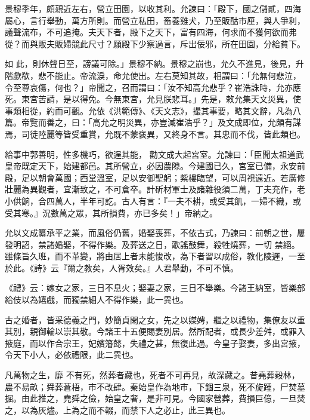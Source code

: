 \begin{pinyinscope}
 景穆季年，頗親近左右，營立田園，以收其利。允諫曰：「殿下，國之儲貳，四海屬心，言行舉動，萬方所則。而營立私田，畜養雞犬，乃至販酤市厘，與人爭利，議聲流布，不可追掩。夫天下者，殿下之天下，富有四海，何求而不獲何欲而弗從？而與販夫販婦競此尺寸？願殿下少察過言，斥出佞邪，所在田園，分給貧下。



 如
 此，則休聲日至，謗議可除。」景穆不納。景穆之崩也，允久不進見，後見，升階歔欷，悲不能止。帝流淚，命允使出。左右莫知其故，相謂曰：「允無何悲泣，令至尊哀傷，何也？」帝聞之，召而謂曰：「汝不知高允悲乎？崔浩誅時，允亦應死。東宮苦請，是以得免。今無東宮，允見朕悲耳。」先是，敕允集天文災異，使事類相從，約而可觀。允依《洪範傳》、《天文志》，撮其事要，略其文辭，凡為八篇。帝覽而善之，曰：「高允之明災異，亦豈減崔浩乎？」及文成即位，允頗有謀焉，司徒陸麗等皆受重賞，允既不蒙褒異，又終身不言。其忠而不伐，皆此類也。



 給事中郭善明，性多機巧，欲逞其能，
 勸文成大起宮室。允諫曰：「臣聞太祖道武皇帝既定天下，始建都邑。其所營立，必因農隙。今建國已久，宮室已備，永安前殿，足以朝會萬國；西堂溫室，足以安御聖躬；紫樓臨望，可以周視遠近。若廣修壯麗為異觀者，宜漸致之，不可倉卒。計斫材軍士及諸雜役須二萬，丁夫充作，老小供餉，合四萬人，半年可訖。古人有言：『一夫不耕，或受其飢，一婦不織，或受其寒。』況數萬之眾，其所損費，亦已多矣！」帝納之。



 允以文成纂承平之業，而風俗仍舊，婚娶喪葬，不依古式，乃諫曰：前朝之世，屢發明詔，禁諸婚娶，不得作樂。及葬送之日，歌謠鼓舞，殺牲燒葬，一切
 禁絕。雖條旨久班，而不革變，將由居上者未能悛改，為下者習以成俗，教化陵遲，一至於此。《詩》云『爾之教矣，人胥效矣。』人君舉動，不可不慎。



 《禮》云：嫁女之家，三日不息火；娶妻之家，三日不舉樂。今諸王納室，皆樂部給伎以為嬉戲，而獨禁細人不得作樂，此一異也。



 古之婚者，皆采德義之門，妙簡貞閑之女，先之以媒娉，繼之以禮物，集僚友以重其別，親御輪以崇其敬。今諸王十五便賜妻別居。然所配者，或長少差舛，或罪入掖庭，而以作合宗王，妃嬪籓懿，失禮之甚，無復此過。今皇子娶妻，多出宮掖，令天下小人，必依禮限，此二異也。



 凡萬物之生，靡
 不有死，然葬者藏也，死者不可再見，故深藏之。昔堯葬穀林，農不易畝；舜葬蒼梧，市不改肆。秦始皇作為地市，下錮三泉，死不旋踵，尸焚墓掘。由此推之，堯舜之儉，始皇之奢，是非可見。今國家營葬，費損巨億，一旦焚之，以為灰燼。上為之而不輟，而禁下人之必止，此三異也。




\end{pinyinscope}
